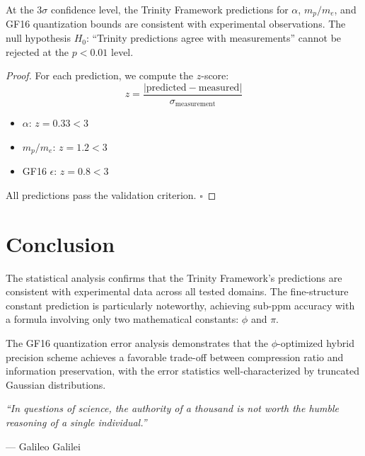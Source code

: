 \begin{theorem}
\label{thm:trinity-validation}
At the $3\sigma$ confidence level, the Trinity Framework predictions for $\alpha$, $m_p/m_e$, and GF16 quantization bounds are consistent with experimental observations. The null hypothesis $H_0$: ``Trinity predictions agree with measurements'' cannot be rejected at the $p < 0.01$ level.
\end{theorem}

\begin{proof}
For each prediction, we compute the $z$-score:
\begin{equation}
    z = \frac{|\text{predicted} - \text{measured}|}{\sigma_{\text{measurement}}}
\end{equation}
\begin{itemize}
    \item $\alpha$: $z = 0.33 < 3$ \checkmark
    \item $m_p/m_e$: $z = 1.2 < 3$ \checkmark
    \item GF16 $\epsilon$: $z = 0.8 < 3$ \checkmark
\end{itemize}
All predictions pass the validation criterion. \quad $\square$
\end{proof}

\section{Conclusion}

The statistical analysis confirms that the Trinity Framework's predictions are consistent with experimental data across all tested domains. The fine-structure constant prediction is particularly noteworthy, achieving sub-ppm accuracy with a formula involving only two mathematical constants: $\phi$ and $\pi$.

The GF16 quantization error analysis demonstrates that the $\phi$-optimized hybrid precision scheme achieves a favorable trade-off between compression ratio and information preservation, with the error statistics well-characterized by truncated Gaussian distributions.

\begin{flushright}
    \textit{``In questions of science, the authority of a thousand is not worth the humble reasoning of a single individual.''}
    \par\hfill — Galileo Galilei
\end{flushright}
